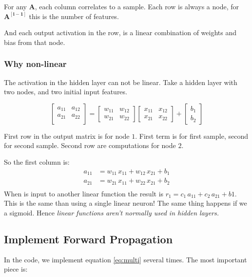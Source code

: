 For any $\mathbf{A}$, each column correlates to a sample. Each row is always a node, for $\mathbf{{A}^{[i-1]}}$ this is the number of features.

And each output activation in the row, is a linear combination of weights and bias from that node.

\subsubsection{Why non-linear}
The activation in the hidden layer can not be linear. Take a hidden layer with two nodes, and two initial input features.

\begin{equation*}
  \begin{bmatrix}
    a_{11} & a_{12}\\
    a_{21} & a_{22}\\
  \end{bmatrix}
  = 
  \begin{bmatrix}
    w_{11}& w_{12}\\
    w_{21}& w_{22}
  \end{bmatrix}
  \begin{bmatrix}
    x_{11} & x_{12}\\
    x_{21} & x_{22} 
  \end{bmatrix}
  + \begin{bmatrix}b_1\\ b_2\end{bmatrix}
\end{equation*}

First row in the output matrix is for node $1$. First term is for first sample, second for second sample. Second row are computations for node $2$.

So the first column is:
\begin{align*}
  a_{11} &= w_{11}\,x_{11} + w_{12}\,x_{21} + b_1\\
  a_{21} &= w_{21}\,x_{11} + w_{22}\,x_{21} + b_2\\
\end{align*}
When is input to another linear function the result is $r_1 = c_1\,a_{11} + c_2\,a_{21} + b1$. This is the same than using a single linear neuron! The same thing happens if we a sigmoid. Hence \textit{linear functions aren't normally used in hidden layers.}

\subsection{Implement Forward Propagation}
In the code, we implement equation \ref{eq:multi} several times. The most important piece is:

